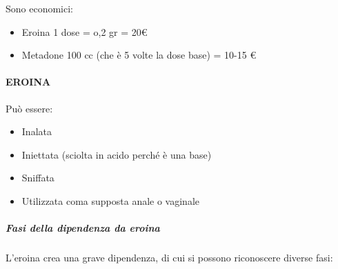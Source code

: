 Sono economici:

\begin{itemize}
\item
  Eroina 1 dose = o,2 gr = 20\euro{}
\item
  Metadone 100 cc (che è 5 volte la dose base) = 10-15 \euro{}
\end{itemize}

\paragraph{EROINA}

Può essere:

\begin{itemize}
\item
  Inalata
\item
  Iniettata (sciolta in acido perché è una base)
\item
  Sniffata
\item
  Utilizzata coma supposta anale o vaginale
\end{itemize}

\subparagraph{Fasi della dipendenza da eroina}

L'eroina crea una grave dipendenza, di cui si possono riconoscere
diverse fasi:

